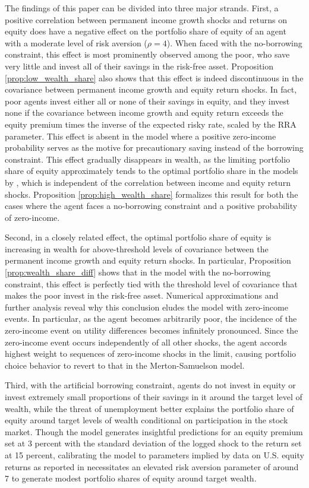 The findings of this paper can be divided into three major strands. First, a positive correlation between permanent income growth shocks and returns on equity does have a negative effect on the portfolio share of equity of an agent with a moderate level of risk aversion ($\rho = 4$). When faced with the no-borrowing constraint, this effect is most prominently observed among the poor, who save very little and invest all of their savings in the risk-free asset. Proposition \ref{prop:low_wealth_share} also shows that this effect is indeed discontinuous in the covariance between permanent income growth and equity return shocks. In fact, poor agents invest either all or none of their savings in equity, and they invest none if the covariance between income growth and equity return exceeds the equity premium times the inverse of the expected risky rate, scaled by the RRA parameter. This effect is absent in the model where a positive zero-income probability serves as the motive for precautionary saving instead of the borrowing constraint. This effect gradually disappears in wealth, as the limiting portfolio share of equity approximately tends to the optimal portfolio share in the models by \citet{Merton1969,Samuelson1969}, which is independent of the correlation between income and equity return shocks. Proposition \ref{prop:high_wealth_share} formalizes this result for both the cases where the agent faces a no-borrowing constraint and a positive probability of zero-income.

Second, in a closely related effect, the optimal portfolio share of equity is increasing in wealth for above-threshold levels of covariance between the permanent income growth and equity return shocks. In particular, Proposition \ref{prop:wealth_share_diff} shows that in the model with the no-borrowing constraint, this effect is perfectly tied with the threshold level of covariance that makes the poor invest in the risk-free asset. Numerical approximations and further analysis reveal why this conclusion eludes the model with zero-income events. In particular, as the agent becomes arbitrarily poor, the incidence of the zero-income event on utility differences becomes infinitely pronounced. Since the zero-income event occurs independently of all other shocks, the agent accords highest weight to sequences of zero-income shocks in the limit, causing portfolio choice behavior to revert to that in the Merton-Samuelson model.

Third, with the artificial borrowing constraint, agents do not invest in equity or invest extremely small proportions of their savings in it around the target level of wealth, while the threat of unemployment better explains the portfolio share of equity around target levels of wealth conditional on participation in the stock market. Though the model generates insightful predictions for an equity premium set at 3 percent with the standard deviation of the logged shock to the return set at 15 percent, calibrating the model to parameters implied by data on U.S. equity returns as reported in \citet{Mehra2006} necessitates an elevated risk aversion parameter of around 7 to generate modest portfolio shares of equity around target wealth.

